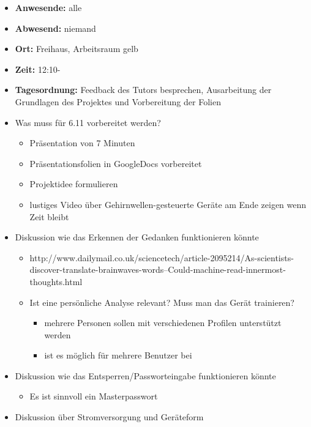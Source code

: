 \begin{itemize}
\item
  \textbf{Anwesende:} alle
\item
  \textbf{Abwesend:} niemand
\item
  \textbf{Ort:} Freihaus, Arbeitsraum gelb
\item
  \textbf{Zeit:} 12:10-
\item
  \textbf{Tagesordnung:} Feedback des Tutors besprechen, Ausarbeitung
  der Grundlagen des Projektes und Vorbereitung der Folien
\item
  Was muss für 6.11 vorbereitet werden?

  \begin{itemize}
  \itemsep1pt\parskip0pt
  \item
    Präsentation von 7 Minuten
  \item
    Präsentationsfolien in GoogleDocs vorbereitet
  \item
    Projektidee formulieren
  \item
    lustiges Video über Gehirnwellen-gesteuerte Geräte am Ende zeigen
    wenn Zeit bleibt
  \end{itemize}
\item
  Diskussion wie das Erkennen der Gedanken funktionieren könnte

  \begin{itemize}
  \itemsep1pt\parskip0pt
  \item
    http://www.dailymail.co.uk/sciencetech/article-2095214/As-scientists-discover-translate-brainwaves-words--Could-machine-read-innermost-thoughts.html
  \item
    Ist eine persönliche Analyse relevant? Muss man das Gerät
    trainieren?

    \begin{itemize}
    \itemsep1pt\parskip0pt
    \item
      mehrere Personen sollen mit verschiedenen Profilen unterstützt
      werden
    \item
      ist es möglich für mehrere Benutzer bei
    \end{itemize}
  \end{itemize}
\item
  Diskussion wie das Entsperren/Passworteingabe funktionieren könnte

  \begin{itemize}
  \itemsep1pt\parskip0pt
  \item
    Es ist sinnvoll ein Masterpasswort
  \end{itemize}
\item
  Diskussion über Stromversorgung und Geräteform


\end{itemize}
